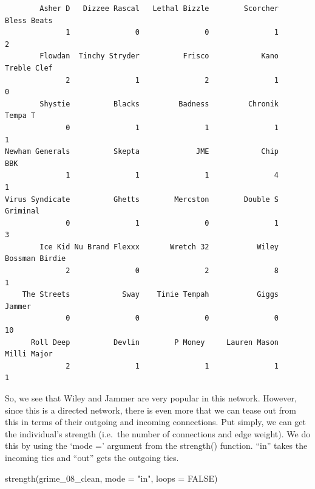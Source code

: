 \documentclass[
  letterpaper,
  DIV=11,
  numbers=noendperiod]{scrreprt}
\newenvironment{Shaded}{\begin{snugshade}}{\end{snugshade}}
\newcommand{\AttributeTok}[1]{\textcolor[rgb]{0.40,0.45,0.13}{#1}}
\newcommand{\ConstantTok}[1]{\textcolor[rgb]{0.56,0.35,0.01}{#1}}
\newcommand{\FunctionTok}[1]{\textcolor[rgb]{0.28,0.35,0.67}{#1}}
\newcommand{\NormalTok}[1]{\textcolor[rgb]{0.00,0.23,0.31}{#1}}
\newcommand{\StringTok}[1]{\textcolor[rgb]{0.13,0.47,0.30}{#1}}
\begin{document}
\begin{verbatim}
        Asher D   Dizzee Rascal   Lethal Bizzle        Scorcher     Bless Beats 
              1               0               0               1               2 
        Flowdan  Tinchy Stryder          Frisco            Kano     Treble Clef 
              2               1               2               1               0 
        Shystie          Blacks         Badness         Chronik         Tempa T 
              0               1               1               1               1 
Newham Generals          Skepta             JME            Chip             BBK 
              1               1               1               4               1 
Virus Syndicate          Ghetts        Mercston        Double S        Griminal 
              0               1               0               1               3 
        Ice Kid Nu Brand Flexxx       Wretch 32           Wiley  Bossman Birdie 
              2               0               2               8               1 
    The Streets            Sway    Tinie Tempah           Giggs          Jammer 
              0               0               0               0              10 
      Roll Deep          Devlin        P Money     Lauren Mason     Milli Major 
              2               1               1               1               1 
\end{verbatim}

So, we see that Wiley and Jammer are very popular in this network.
However, since this is a directed network, there is even more that we
can tease out from this in terms of their outgoing and incoming
connections. Put simply, we can get the individual's strength (i.e.~the
number of connections and edge weight). We do this by using the `mode ='
argument from the strength() function. ``in'' takes the incoming ties
and ``out'' gets the outgoing ties.

\begin{Shaded}
\begin{Highlighting}[]
\FunctionTok{strength}\NormalTok{(grime\_08\_clean, }\AttributeTok{mode =} \StringTok{"in"}\NormalTok{, }\AttributeTok{loops =} \ConstantTok{FALSE}\NormalTok{)}
\end{Highlighting}
\end{Shaded}
\end{document}
